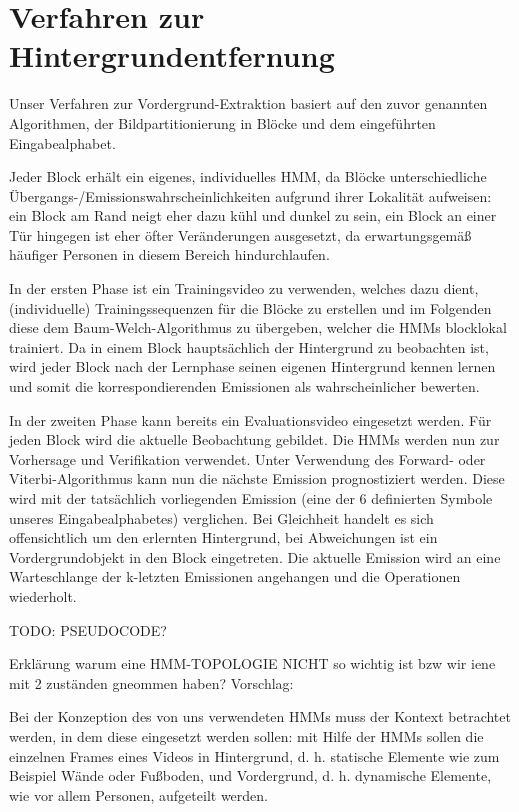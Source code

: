 \section{Verfahren zur Hintergrundentfernung}

Unser Verfahren zur Vordergrund-Extraktion basiert auf den zuvor genannten  Algorithmen, der Bildpartitionierung in Blöcke und dem eingeführten Eingabealphabet.


Jeder Block erhält ein eigenes, individuelles HMM, da Blöcke unterschiedliche Übergangs-/Emissionswahrscheinlichkeiten aufgrund ihrer Lokalität aufweisen: ein Block am Rand neigt eher dazu kühl und dunkel zu sein, ein Block an einer Tür hingegen ist eher öfter Veränderungen ausgesetzt, da erwartungsgemäß häufiger Personen in diesem Bereich hindurchlaufen.
 

In der ersten Phase ist ein Trainingsvideo zu verwenden, welches dazu dient, (individuelle) Trainingssequenzen für die Blöcke zu erstellen und im Folgenden diese dem Baum-Welch-Algorithmus zu übergeben, welcher die HMMs blocklokal trainiert.
 Da in einem Block hauptsächlich der Hintergrund zu beobachten ist, wird jeder Block nach der Lernphase seinen eigenen Hintergrund kennen lernen und somit die korrespondierenden Emissionen als wahrscheinlicher bewerten.


In der zweiten Phase kann bereits ein Evaluationsvideo eingesetzt werden.
 Für jeden Block wird die aktuelle Beobachtung gebildet.
 Die HMMs werden nun zur Vorhersage und Verifikation verwendet.
 Unter Verwendung des Forward- oder Viterbi-Algorithmus kann nun die nächste Emission prognostiziert werden.
 Diese wird mit der tatsächlich vorliegenden Emission (eine der 6 definierten Symbole unseres Eingabealphabetes) verglichen.
 Bei Gleichheit handelt es sich offensichtlich um den erlernten Hintergrund, bei Abweichungen ist ein Vordergrundobjekt in den Block eingetreten.
 Die aktuelle Emission wird an eine Warteschlange der k-letzten Emissionen angehangen und die Operationen wiederholt.




TODO: PSEUDOCODE?

Erklärung warum eine HMM-TOPOLOGIE NICHT so wichtig ist bzw wir iene mit 2 zuständen gneommen haben? 
Vorschlag:

Bei der Konzeption des von uns verwendeten HMMs muss der Kontext betrachtet werden, in dem diese eingesetzt werden sollen: mit Hilfe der HMMs sollen die einzelnen  Frames eines Videos in Hintergrund, d.
h.
 statische Elemente wie zum Beispiel Wände oder Fußboden, und Vordergrund, d.
h.
 dynamische Elemente, wie vor allem Personen, aufgeteilt werden.

